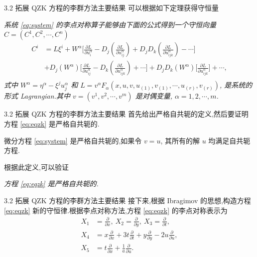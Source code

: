 \documentclass{beamer}
\begin{document}
\begin{frame}{3.2 拓展 QZK 方程的李群方法主要结果}
\qquad 可以根据如下定理获得守恒量

\begin{theorem}
\emph{系统 \eqref{eq:system} 的李点对称算子能够由下面的公式得到一个守恒向量 $C=(C^1,C^2,\cdots,C^n)$
\begin{equation*}
\begin{aligned}
C^i&=L\xi^i+W^\alpha \bigg[\frac{\partial L}{\partial u^\alpha_i}-D_j(\frac{\partial L}{\partial u^\alpha_{ij}})+D_jD_k(\frac{\partial L}{\partial u^\alpha_{ijk}})-\cdots\bigg]\\
&+D_j(W^\alpha)\bigg[\frac{\partial L}{\partial u^\alpha_{ij}}-D_k(\frac{\partial L}{\partial u^\alpha_{ijk}})+\cdots\bigg]+D_jD_k(W^\alpha)\bigg[\frac{\partial L}{\partial u^\alpha_{ijk}}\bigg]+\cdots,\\
\end{aligned}
\end{equation*}
式中 $W^\alpha=\eta^\alpha-\xi^ju^\alpha_j$ 和 $L=v^\alpha F_\alpha(x,u,v,u_{(1)},v_{(1)},\cdots,u_{(r)},v_{(r)})$, 是系统的形式 Lagrangian.其中 $v= (v^1,v^2,\cdots,v^m)$ 是对偶变量, $\alpha=1,2,\cdots, m$.}
\end{theorem}
\end{frame}

\begin{frame}{3.2 拓展 QZK 方程的李群方法主要结果}
\qquad 首先给出严格自共轭的定义,然后要证明方程 \eqref{eq:eqzk} 是严格自共轭的.

\begin{definition}[严格自共轭]
	微分方程 \eqref{eq:system} 是严格自共轭的,如果令 $v=u$, 其所有的解 $u$ 均满足自共轭方程.
\end{definition}

\qquad 根据此定义,可以验证

\begin{theorem}
\emph{方程 \eqref{eq:eqzk} 是严格自共轭的.}
\end{theorem}
\end{frame}

\begin{frame}{3.2 拓展 QZK 方程的李群方法主要结果}
\qquad 接下来,根据 Ibragimov 的思想,构造方程 \eqref{eq:eqzk} 新的守恒律.根据李点对称方法,方程 \eqref{eq:eqzk} 的李点对称表示为
\begin{align*}
	X_{1}&=\frac{\partial}{\partial x},~X_{2}=\frac{\partial}{\partial y},~X_{3}=\frac{\partial}{\partial t},\\
	X_{4}&=x\frac{\partial}{\partial x}+3t\frac{\partial}{\partial t}+y\frac{\partial}{\partial y}-2u\frac{\partial}{\partial u},\\
	X_{5}&=t\frac{\partial}{\partial x}+\frac{1}{a}\frac{\partial}{\partial u}.
\end{align*}
\end{frame}
\end{document}
